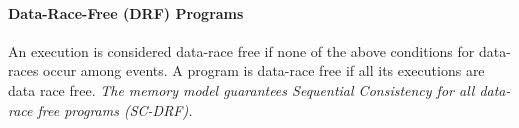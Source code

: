         
        
        \paragraph{Data-Race-Free (DRF) Programs}
            An execution is considered data-race free if none of the above conditions for data-races occur among events. A program is data-race free if all its executions are data race free.          
            \textit{The memory model guarantees Sequential Consistency for all data-race free programs (SC-DRF).}
        